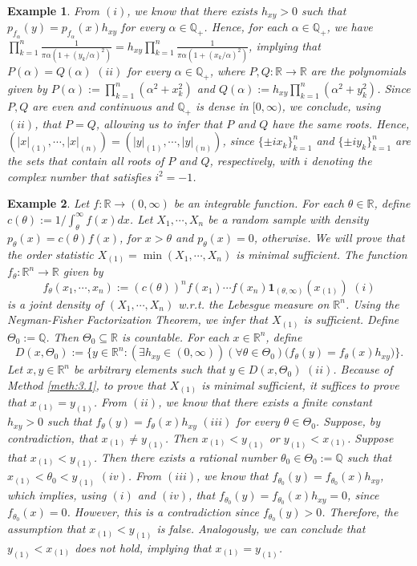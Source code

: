 \documentclass[12pt]{article}
\newtheorem{example}{Example}[section]
\begin{document}
\begin{example}
From $(i)$, we know that there exists $h_{xy}>0$ such that $p_{f_\alpha }(y)=p_{f_\alpha }(x)h_{xy}$ for every $\alpha \in\mathbb{Q}_+$. Hence, for each $\alpha \in \mathbb{Q}_+$, we have $\prod _{k=1}^n\frac{1}{\pi\alpha (1+(y_k/\alpha )^2)}=h_{xy}\prod _{k=1}^n\frac{1}{\pi\alpha (1+(x_k/\alpha )^2)}$, implying that $P(\alpha )=Q(\alpha )\,\,(ii)$ for every $\alpha \in \mathbb{Q}_+$, where $P,Q:\mathbb{R}\to \mathbb{R}$ are the polynomials given by $P(\alpha ):=\prod _{k=1}^n(\alpha ^2+x_k^2)$ and $Q(\alpha ):=h_{xy}\prod _{k=1}^n(\alpha ^2+y_k^2)$. Since $P,Q$ are even and continuous and $\mathbb{Q}_+$ is dense in $[0,\infty )$, we conclude, using $(ii)$, that $P=Q$, allowing us to infer that $P$ and $Q$ have the same roots. Hence, $(|x|_{(1)},\cdots, |x|_{(n)})=(|y|_{(1)},\cdots, |y|_{(n)})$, since $\{\pm ix_k\}_{k=1}^n$ and $\{\pm iy_k\}_{k=1}^n$ are the sets that contain all roots of $P$ and $Q$, respectively, with $i$ denoting the complex number that satisfies $i^2=-1$.
\end{example}

\begin{example}
\label{ex:4.2}
Let $f:\mathbb{R}\to (0,\infty )$ be an integrable function. For each $\theta\in\mathbb{R}$, define $c(\theta ):=1/\int_\theta ^\infty f(x)dx$. Let $X_1,\cdots,X_n$ be a random sample with density $p_\theta (x)=c(\theta )f(x)$, for $x>\theta $ and $p_\theta (x)=0$, otherwise. We will prove that the order statistic $X_{(1)}=\min (X_1,\cdots, X_n)$ is minimal sufficient. The function $f_\theta :\mathbb{R}^n\to \mathbb{R}$ given by
$$f_{\theta }(x_1,\cdots,x_n):=(c(\theta ))^nf(x_1)\cdots f(x_n)\mathbf{1}_{(\theta ,\infty )}(x_{(1)})\,\,(i)$$
is a joint density of $(X_1,\cdots, X_n)$ w.r.t. the Lebesgue measure on $\mathbb{R}^n$. Using the Neyman-Fisher Factorization Theorem, we infer that $X_{(1)}$ is sufficient. Define $\Theta _0:=\mathbb{Q}$. Then $\Theta _0\subseteq\mathbb{R}$ is countable. For each $x\in\mathbb{R}^n$, define
$$D(x,\Theta _0):=\big\{y\in\mathbb{R}^n:(\exists h_{xy}\in (0,\infty ))(\forall \theta \in \Theta _0)\big(f_\theta (y)=f_\theta (x)h_{xy}\big)\big\}.$$
Let $x,y\in\mathbb{R}^n$ be arbitrary elements such that $y\in D(x,\Theta _0)\,\,(ii)$. Because of Method \ref{meth:3.1}, to prove that $X_{(1)}$ is minimal sufficient, it suffices to prove that $x_{(1)}=y_{(1)}$. From $(ii)$, we know that there exists a finite constant $h_{xy}>0$ such that $f_\theta (y)=f_\theta (x)h_{xy}\,\,(iii)$ for every $\theta\in \Theta _0$. Suppose, by contradiction, that $x_{(1)}\neq y_{(1)}$. Then $x_{(1)}<y_{(1)}$ or $y_{(1)}<x_{(1)}$. Suppose that $x_{(1)}<y_{(1)}$. Then there exists a rational number $\theta _0\in \Theta _0:=\mathbb{Q}$ such that $x_{(1)}<\theta _0<y_{(1)}\,\,(iv)$. From $(iii)$, we know that $f_{\theta_0} (y)=f_{\theta_0} (x)h_{xy}$, which implies, using $(i)$ and $(iv)$, that $f_{\theta _0}(y)=f_{\theta _0}(x)h_{xy}=0$, since $f_{\theta _0}(x)=0$. However, this is a contradiction since $f_{\theta _0}(y)>0$. Therefore, the assumption that $x_{(1)}<y_{(1)}$ is false. Analogously, we can conclude that $y_{(1)}<x_{(1)}$ does not hold, implying that $x_{(1)}=y_{(1)}$.
\end{example}
\end{document}
